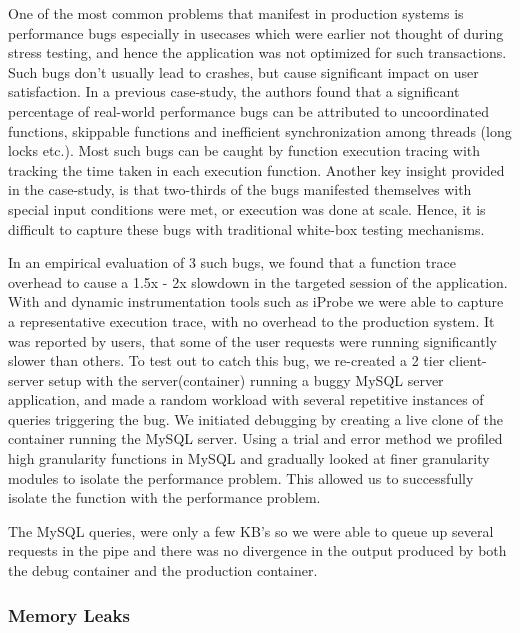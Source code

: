 One of the most common problems that manifest in production systems is performance bugs especially in usecases which were earlier not thought of during stress testing, and hence the application was not optimized for such transactions.
Such bugs don't usually lead to crashes, but cause significant impact on user satisfaction.
In a previous case-study\cite{shanluPerf}, the authors found that a significant percentage of real-world performance bugs can be attributed to uncoordinated functions, skippable functions and inefficient synchronization among threads (long locks etc.).
Most such bugs can be caught by function execution tracing with tracking the time taken in each execution function.
Another key insight provided in the case-study, is that two-thirds of the bugs manifested themselves with special input conditions were met, or execution was done at scale. Hence, it is difficult to capture these bugs with traditional white-box testing mechanisms.

In an empirical evaluation of 3 such bugs, we found that a function trace overhead to cause a 1.5x - 2x slowdown in the targeted session of the application. 
With \parikshan and dynamic instrumentation tools such as iProbe\cite{iProbe} we were able to capture a representative execution trace, with no overhead to the production system.
It was reported by users, that some of the user requests were running significantly slower than others.
To test out \parikshan to catch this bug, we re-created a 2 tier client-server setup with the server(container) running a buggy MySQL server application, and made a random workload with several repetitive instances of queries triggering the bug.
We initiated debugging by creating a live clone of the container running the MySQL server.
Using a trial and error method we profiled high granularity functions in MySQL and gradually looked at finer granularity modules to isolate the performance problem.
This allowed us to successfully isolate the function with the performance problem.


The MySQL queries, were only a few KB's so we were able to queue up several requests in the pipe and there was no divergence in the output produced by both the debug container and the production container. 


\subsubsection{Memory Leaks}
\label{sec:memoryLeaks}

